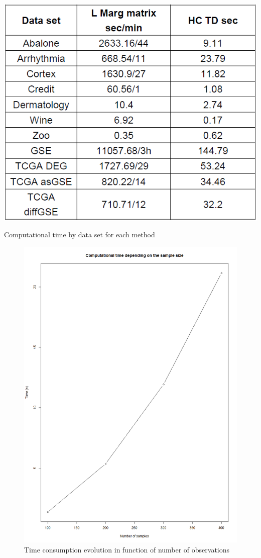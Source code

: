 \documentclass[twocolumn,12pt]{article}
\begin{document}
\begin{table}[!]
    \centering
    \includegraphics[scale=0.4]{img/runTime.png}
    \caption{Computational time by data set for each method}
    \label{tab:runTime}
\end{table}
\begin{figure}[!]
    \centering
    \includegraphics[scale=0.3]{img/ObsTime.png}
    \caption{Time consumption evolution in function of number of observations}
    \label{fig:tpsObs}
\end{figure}
\end{document}
